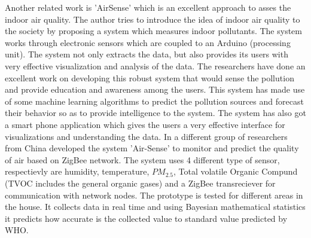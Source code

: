  Another related work is 'AirSense'\cite{Fang2016} which is an excellent approach to asses the indoor air quality. The author tries to introduce the idea of indoor air quality to the society by proposing a system which measures indoor pollutants. The system works through electronic sensors which are coupled to an Arduino (processing unit). The system not only extracts the data, but also provides its users with very effective visualization and analysis of the data. The researchers have done an excellent work on developing this robust system that would sense the pollution and provide education and awareness among the users. This system has made use of some machine learning algorithms to predict the pollution sources and forecast their behavior so as to provide intelligence to the system. 
The system has also got a smart phone application which gives the users a very effective interface for visualizations and understanding the data. In \cite{Liu2017} a different group of researchers from China developed the system 'Air-Sense' to monitor and predict the quality of air based on ZigBee network. The system uses 4 different type of sensor, respectievly are humidity, temperature, $PM_{2.5}$, Total volatile Organic Compund (TVOC includes the general organic gases) and a ZigBee transreciever for communication with network nodes. The prototype is tested for different areas in the house. It collects data in real time and using Bayesian mathematical statistics it predicts how accurate is the collected value to standard value predicted by WHO. 
\par

